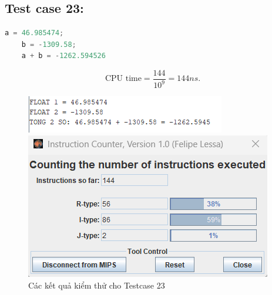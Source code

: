 \subsection{Test case 23:}
\begin{lstlisting}[language=Python]
    a = 46.985474;
    b = -1309.58;
    a + b = -1262.594526
\end{lstlisting}
\[
\text{CPU time} = \frac{\text{144}}{10^9} = 144 ns.
\]
\begin{figure}[!h]
    \centering
    \begin{minipage}[b]{0.48\textwidth}
        \centering
        \includegraphics[width=\textwidth]{image/TESTCASE/Testcase 23.png}
    \end{minipage}
    \hfill
    \begin{minipage}[b]{0.48\textwidth}
        \centering
        \includegraphics[width=\textwidth]{image/TESTCASE/Instruction Counter 23.png}
    \end{minipage}
    \vspace{0.5cm}
    \caption{Các kết quả kiểm thử cho Testcase 23}
\end{figure}


